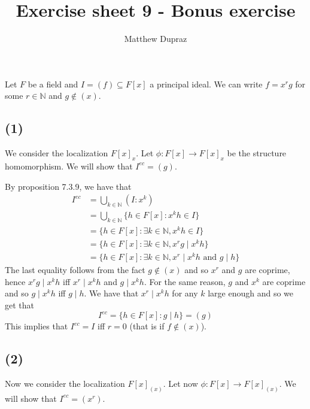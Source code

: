 \documentclass{article}
\title{Exercise sheet 9 - Bonus exercise}
\author{Matthew Dupraz}
\newcommand{\N}{\mathbb{N}}
\begin{document}
	
\maketitle

Let $F$ be a field and $I = (f) \subseteq F[x]$ a principal ideal.
We can write $f = x^rg$ for some $r \in \N$ and $g \not\in (x)$.

\subsection*{(1)}

We consider the localization $F[x]_x$. Let $\phi: F[x] \to F[x]_x$ be the
structure homomorphism. We will show that
$I^{ec} = (g)$.

By proposition 7.3.9, we have that
\begin{align*}
	I^{ec} &= \bigcup_{k \in \N} (I : x^k)\\
	&= \bigcup_{k \in \N} \{h \in F[x] : x^kh \in I \}\\
	&= \{h \in F[x] : \exists k \in \N, x^kh \in I\}\\
	&= \{h \in F[x] : \exists k \in \N, x^rg \mid x^kh\}\\
	&= \{h \in F[x] : \exists k \in \N, x^r \mid x^kh
	\textrm{ and } g \mid h\}
\end{align*}
The last equality follows from the fact $g \not\in (x)$ and so $x^r$ 
and $g$ are coprime, hence $x^rg \mid x^kh$ iff $x^r \mid x^kh$ and
$g \mid x^k h$. For the same reason, $g$ and $x^k$ are coprime and so
$g \mid x^k h$ iff $g \mid h$. We have that $x^r \mid x^k h$ for any $k$
large enough and so we get that
\begin{equation*}
	I^{ec} = \{h \in F[x]: g \mid h\} = (g)
\end{equation*}
This implies that $I^{ec} = I$ iff $r = 0$ (that is if $f \not\in (x)$).

\subsection*{(2)}

Now we consider the localization $F[x]_{(x)}$. Let now
$\phi: F[x] \to F[x]_{(x)}$. We will show that $I^{ec} = (x^r)$.
\end{document}
